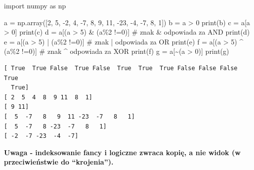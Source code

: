 \documentclass[
  polish,
  letterpaper,
  DIV=11,
  numbers=noendperiod]{scrreprt}
\newenvironment{Shaded}{\begin{snugshade}}{\end{snugshade}}
\newcommand{\BuiltInTok}[1]{\textcolor[rgb]{0.00,0.23,0.31}{#1}}
\newcommand{\CommentTok}[1]{\textcolor[rgb]{0.37,0.37,0.37}{#1}}
\newcommand{\DecValTok}[1]{\textcolor[rgb]{0.68,0.00,0.00}{#1}}
\newcommand{\ImportTok}[1]{\textcolor[rgb]{0.00,0.46,0.62}{#1}}
\newcommand{\NormalTok}[1]{\textcolor[rgb]{0.00,0.23,0.31}{#1}}
\newcommand{\OperatorTok}[1]{\textcolor[rgb]{0.37,0.37,0.37}{#1}}
\begin{document}
\begin{Shaded}
\begin{Highlighting}[]
\ImportTok{import}\NormalTok{ numpy }\ImportTok{as}\NormalTok{ np}

\NormalTok{a }\OperatorTok{=}\NormalTok{ np.array([}\DecValTok{2}\NormalTok{, }\DecValTok{5}\NormalTok{, }\OperatorTok{{-}}\DecValTok{2}\NormalTok{, }\DecValTok{4}\NormalTok{, }\OperatorTok{{-}}\DecValTok{7}\NormalTok{, }\DecValTok{8}\NormalTok{, }\DecValTok{9}\NormalTok{, }\DecValTok{11}\NormalTok{, }\OperatorTok{{-}}\DecValTok{23}\NormalTok{, }\OperatorTok{{-}}\DecValTok{4}\NormalTok{, }\OperatorTok{{-}}\DecValTok{7}\NormalTok{, }\DecValTok{8}\NormalTok{, }\DecValTok{1}\NormalTok{])}
\NormalTok{b }\OperatorTok{=}\NormalTok{ a }\OperatorTok{\textgreater{}} \DecValTok{0}
\BuiltInTok{print}\NormalTok{(b)}
\NormalTok{c }\OperatorTok{=}\NormalTok{ a[a }\OperatorTok{\textgreater{}} \DecValTok{0}\NormalTok{]}
\BuiltInTok{print}\NormalTok{(c)}
\NormalTok{d }\OperatorTok{=}\NormalTok{ a[(a }\OperatorTok{\textgreater{}} \DecValTok{5}\NormalTok{) }\OperatorTok{\&}\NormalTok{ (a}\OperatorTok{\%}\DecValTok{2} \OperatorTok{!=}\DecValTok{0}\NormalTok{)] }\CommentTok{\# znak \& odpowiada za AND}
\BuiltInTok{print}\NormalTok{(d)}
\NormalTok{e }\OperatorTok{=}\NormalTok{ a[(a }\OperatorTok{\textgreater{}} \DecValTok{5}\NormalTok{) }\OperatorTok{|}\NormalTok{ (a}\OperatorTok{\%}\DecValTok{2} \OperatorTok{!=}\DecValTok{0}\NormalTok{)] }\CommentTok{\# znak | odpowiada za OR}
\BuiltInTok{print}\NormalTok{(e)}
\NormalTok{f }\OperatorTok{=}\NormalTok{ a[(a }\OperatorTok{\textgreater{}} \DecValTok{5}\NormalTok{) }\OperatorTok{\^{}}\NormalTok{ (a}\OperatorTok{\%}\DecValTok{2} \OperatorTok{!=}\DecValTok{0}\NormalTok{)] }\CommentTok{\# znak \^{} odpowiada za XOR}
\BuiltInTok{print}\NormalTok{(f)}
\NormalTok{g }\OperatorTok{=}\NormalTok{ a[}\OperatorTok{\textasciitilde{}}\NormalTok{(a }\OperatorTok{\textgreater{}} \DecValTok{0}\NormalTok{)]}
\BuiltInTok{print}\NormalTok{(g)}
\end{Highlighting}
\end{Shaded}

\begin{verbatim}
[ True  True False  True False  True  True  True False False False  True
  True]
[ 2  5  4  8  9 11  8  1]
[ 9 11]
[  5  -7   8   9  11 -23  -7   8   1]
[  5  -7   8 -23  -7   8   1]
[ -2  -7 -23  -4  -7]
\end{verbatim}

\textbf{Uwaga - indeksowanie fancy i logiczne zwraca kopię, a nie widok
(w przeciwieństwie do ``krojenia'').}
\end{document}
